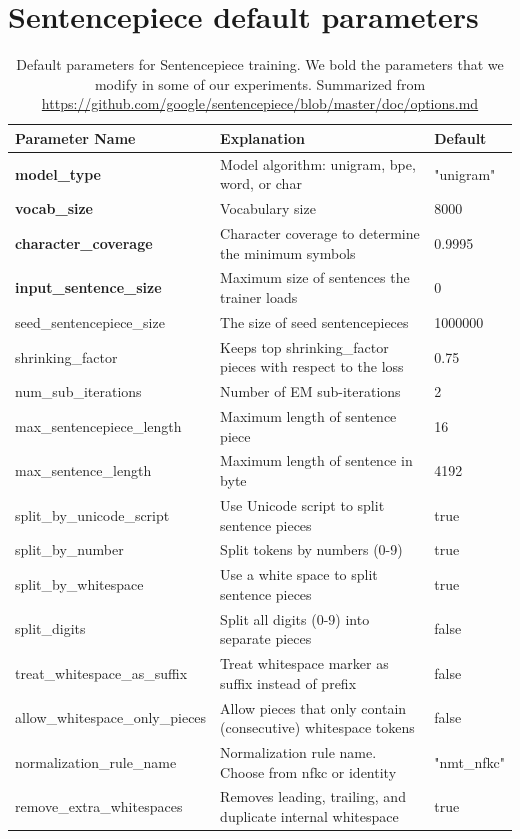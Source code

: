 \chapter{Sentencepiece default parameters}


\begin{table}[h]
    \centering
    \begin{tabular}{|p{5.3cm}|p{5cm}|p{2cm}|}
    \hline
    \textbf{Parameter Name} & \textbf{Explanation} & \textbf{Default} \\
    \hline
    \textbf{model\_type} & Model algorithm: unigram, bpe, word, or char & "unigram" \\
    \hline
    \textbf{vocab\_size} & Vocabulary size & 8000 \\
    \hline
    \textbf{character\_coverage} & Character coverage to determine the minimum symbols & 0.9995 \\
    \hline
    \textbf{input\_sentence\_size} & Maximum size of sentences the trainer loads & 0 \\
    \hline
    seed\_sentencepiece\_size & The size of seed sentencepieces & 1000000 \\
    \hline
    shrinking\_factor & Keeps top shrinking\_factor pieces with respect to the loss & 0.75 \\
    \hline
    num\_sub\_iterations & Number of EM sub-iterations & 2 \\
    \hline
    max\_sentencepiece\_length & Maximum length of sentence piece & 16 \\
    \hline
    max\_sentence\_length & Maximum length of sentence in byte & 4192 \\
    \hline
    split\_by\_unicode\_script & Use Unicode script to split sentence pieces & true \\
    \hline
    split\_by\_number & Split tokens by numbers (0-9) & true \\
    \hline
    split\_by\_whitespace & Use a white space to split sentence pieces & true \\
    \hline
    split\_digits & Split all digits (0-9) into separate pieces & false \\
    \hline
    treat\_whitespace\_as\_suffix & Treat whitespace marker as suffix instead of prefix & false \\
    \hline
    allow\_whitespace\_only\_pieces & Allow pieces that only contain (consecutive) whitespace tokens & false \\
    \hline
    normalization\_rule\_name & Normalization rule name. Choose from nfkc or identity & "nmt\_nfkc" \\
    \hline
    remove\_extra\_whitespaces & Removes leading, trailing, and duplicate internal whitespace & true \\
    \hline
    \end{tabular}
    \caption{Default parameters for Sentencepiece training. We bold the parameters that we modify in some of our experiments. Summarized from \url{https://github.com/google/sentencepiece/blob/master/doc/options.md}}
    \label{tab:sentencepiece_defaults}
\end{table}
    

